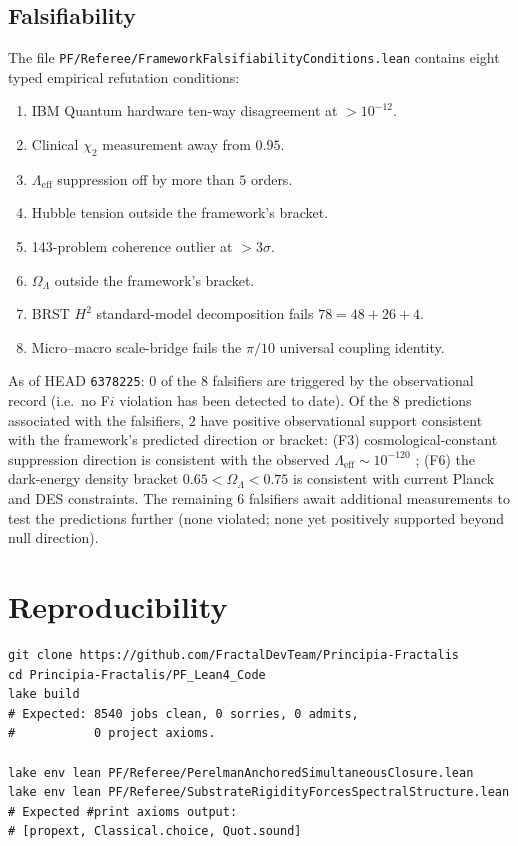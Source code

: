 \documentclass[11pt,a4paper,reqno]{amsart}
\theoremstyle{plain}
\theoremstyle{definition}
\theoremstyle{remark}
\newcommand{\code}[1]{\texttt{#1}}
\begin{document}
\subsection{Falsifiability}
\label{subsec:falsifiability}

The file \code{PF/Referee/FrameworkFalsifiabilityConditions.lean}
contains eight typed empirical refutation conditions:
\begin{enumerate}[label=F\arabic*]
\item IBM Quantum hardware ten-way disagreement at $> 10^{-12}$.
\item Clinical $\chi_{2}$ measurement away from $0.95$.
\item $\Lambda_{\mathrm{eff}}$ suppression off by more than $5$ orders.
\item Hubble tension outside the framework's bracket.
\item 143-problem coherence outlier at $> 3\sigma$.
\item $\Omega_{\Lambda}$ outside the framework's bracket.
\item BRST $H^{2}$ standard-model decomposition fails $78 = 48 + 26 + 4$.
\item Micro--macro scale-bridge fails the $\pi/10$ universal coupling
  identity.
\end{enumerate}
As of HEAD \code{6378225}: $0$ of the $8$ falsifiers are triggered by
the observational record (i.e.\ no F$i$ violation has been detected to
date). Of the $8$ predictions associated with the falsifiers, $2$
have positive observational support consistent with the framework's
predicted direction or bracket: (F3) cosmological-constant suppression
direction is consistent with the observed $\Lambda_{\mathrm{eff}}
\sim 10^{-120}$ \cite{planck2018}; (F6) the dark-energy density
bracket $0.65 < \Omega_{\Lambda} < 0.75$ is consistent with current
Planck and DES constraints. The remaining $6$ falsifiers await
additional measurements to test the predictions further (none
violated; none yet positively supported beyond null direction).

\section{Reproducibility}
\label{sec:reproducibility}

\begin{verbatim}
git clone https://github.com/FractalDevTeam/Principia-Fractalis
cd Principia-Fractalis/PF_Lean4_Code
lake build
# Expected: 8540 jobs clean, 0 sorries, 0 admits,
#           0 project axioms.

lake env lean PF/Referee/PerelmanAnchoredSimultaneousClosure.lean
lake env lean PF/Referee/SubstrateRigidityForcesSpectralStructure.lean
# Expected #print axioms output:
# [propext, Classical.choice, Quot.sound]
\end{verbatim}
\end{document}

